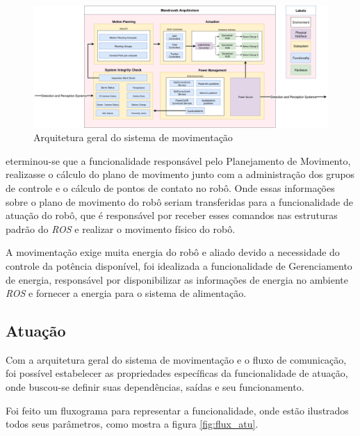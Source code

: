 \begin{figure}[H]
	\centering
	\includegraphics[scale=0.25]{Figures/Arquitetura.png}
	\caption{Arquitetura geral do sistema de movimentação}
	\label{fig:arq_geral}
\end{figure}
eterminou-se que a funcionalidade responsável pelo Planejamento de Movimento, realizasse o cálculo do plano de movimento junto com a administração dos grupos de controle e o cálculo de pontos de contato no robô. Onde essas informações sobre o plano de movimento do robô seriam transferidas para a funcionalidade de atuação do robô, que é responsável por receber esses comandos nas estruturas padrão do \textit{ROS} e realizar o movimento físico do robô.

A movimentação exige muita energia do robô e aliado devido a necessidade do controle da potência disponível, foi idealizada a funcionalidade de Gerenciamento de energia, responsável por disponibilizar as informações de energia no ambiente \textit{ROS} e fornecer a energia para o sistema de alimentação.

\subsection{Atuação}\label{sec:actuation}
Com a arquitetura geral do sistema de movimentação e o fluxo de comunicação, foi possível estabelecer as propriedades específicas da funcionalidade de atuação, onde buscou-se definir suas dependências, saídas e seu funcionamento.

Foi feito um fluxograma para representar a funcionalidade, onde estão ilustrados todos seus parâmetros, como mostra a figura \ref{fig:flux_atu}.

